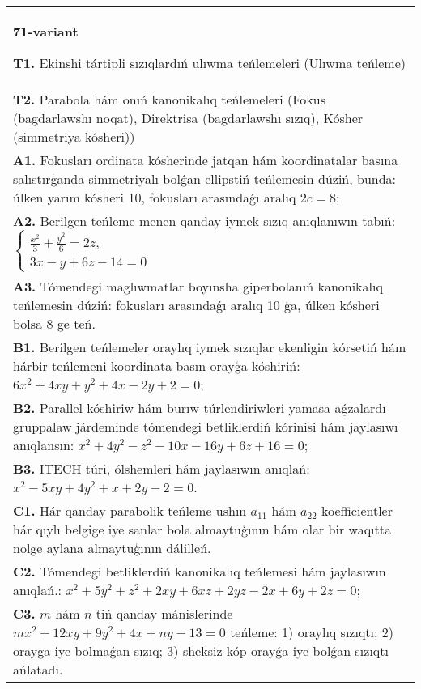 \documentclass{article}
\begin{document}
\begin{tabular}{m{17cm}}
\textbf{71-variant}
\newline

\textbf{T1.} Ekinshi tártipli sızıqlardıń ulıwma teńlemeleri (Ulıwma teńleme) \\
\textbf{T2.} Parabola hám onıń kanonikalıq teńlemeleri (Fokus (bagdarlawshı noqat), Direktrisa (bagdarlawshı sızıq), Kósher (simmetriya kósheri)) \\
\textbf{A1.} Fokusları ordinata kósherinde jatqan hám koordinatalar basına salıstırģanda simmetriyalı bolǵan ellipstiń teńlemesin dúziń, bunda: úlken yarım kósheri 10, fokusları arasındaǵı aralıq $2 c=8$; \\
\textbf{A2.} Berilgen teńleme menen qanday iymek sızıq anıqlanıwın tabıń: $\left\{\begin{array}{l}\frac{x^2}{3}+\frac{y^2}{6}=2 z, \\ 3 x-y+6 z-14=0\end{array}\right.$ \\
\textbf{A3.} Tómendegi maglıwmatlar boyınsha giperbolanıń kanonikalıq teńlemesin dúziń: fokusları arasındaǵı aralıq 10 ģa, úlken kósheri bolsa 8 ge teń. \\
\textbf{B1.} Berilgen teńlemeler oraylıq iymek sızıqlar ekenligin kórsetiń hám hárbir teńlemeni koordinata basın orayģa kóshiriń: $6 x^2+4 x y+y^2+4 x-2 y+2=0$; \\
\textbf{B2.} Parallel kóshiriw hám burıw túrlendiriwleri yamasa aǵzalardı gruppalaw járdeminde tómendegi betliklerdiń kórinisi hám jaylasıwı anıqlansın: $x^2+4 y^2-z^2-10 x-16 y+6 z+16=0$; \\
\textbf{B3.} ITECH túri, ólshemleri hám jaylasıwın anıqlań: $x^2-5 x y+4 y^2+x+2 y-2=0$. \\
\textbf{C1.} Hár qanday parabolik teńleme ushın $a_{11}$ hám $a_{22}$ koefficientler hár qıylı belgige iye sanlar bola almaytuģının hám olar bir waqıtta nolge aylana almaytuģının dálilleń. \\
\textbf{C2.} Tómendegi betliklerdiń kanonikalıq teńlemesi hám jaylasıwın anıqlań.: $x^2+5 y^2+z^2+2 x y+6 x z+2 y z-2 x+6 y+2 z=0$; \\
\textbf{C3.} $m$ hám $n$ tiń qanday mánislerinde $m x^2+12 x y+9 y^2+4 x+n y-13=0$ teńleme: 1) oraylıq sızıqtı; 2) orayga iye bolmaǵan sızıq; 3) sheksiz kóp orayǵa iye bolǵan sızıqtı ańlatadı. \\

\end{tabular}
\vspace{1cm}
\end{document}
